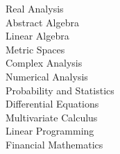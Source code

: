 \begin{minipage}{\textwidth}
    \begin{multicols}{3}
        Real Analysis\\
        Abstract Algebra\\
        Linear Algebra\\
        Metric Spaces\\
        Complex Analysis\\
        Numerical Analysis\\
        Probability and Statistics\\
        Differential Equations\\
        Multivariate Calculus\\
        Linear Programming\\
        Financial Mathematics\\
    \end{multicols}
\end{minipage}
